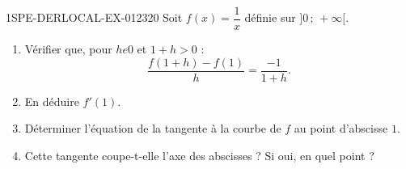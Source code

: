 \begin{exercice}{1SPE-DERLOCAL-EX-012}{3}{20}
Soit $f(x)=\dfrac{1}{x}$ définie sur $]0\,;\,+\infty[$.
\begin{enumerate}
  \item Vérifier que, pour $h
e 0$ et $1+h>0$ :
  \[
  \frac{f(1+h)-f(1)}{h}=\frac{-1}{1+h}.
  \]
  \item En déduire $f'(1)$.
  \item Déterminer l'équation de la tangente à la courbe de $f$ au point d'abscisse $1$.
  \item Cette tangente coupe-t-elle l'axe des abscisses ? Si oui, en quel point ?
\end{enumerate}
\end{exercice}
